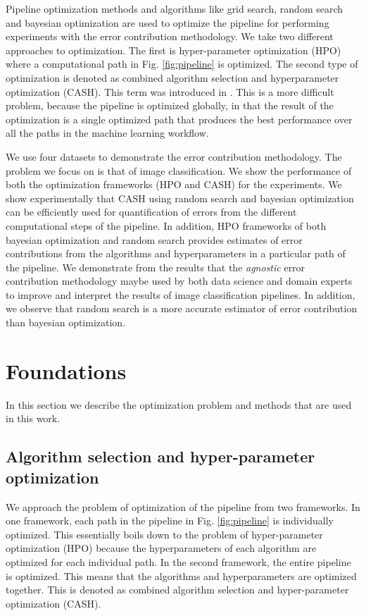 Pipeline optimization methods and algorithms like grid search, random search \cite{bergstra2012random} and bayesian optimization \cite{snoek2012practical} are used to optimize the pipeline for performing experiments with the error contribution methodology. We take two different approaches to optimization. The first is hyper-parameter optimization (HPO) where a computational path in Fig. \ref{fig:pipeline} is optimized. The second type of optimization is denoted as combined algorithm selection and hyperparameter optimization (CASH). This term was introduced in \cite{thornton2013auto}. This is a more difficult problem, because the pipeline is optimized globally, in that the result of the optimization is a single optimized path that produces the best performance over all the paths in the machine learning workflow.  

We use four datasets to demonstrate the error contribution methodology. The problem we focus on is that of image classification. We show the performance of both the optimization frameworks (HPO and CASH) for the experiments. We show experimentally that CASH using random search and bayesian optimization can be efficiently used for quantification of errors from the different computational steps of the pipeline. In addition, HPO frameworks of both bayesian optimization and random search provides  estimates of error contributions from the algorithms and hyperparameters in a particular path of the pipeline.
We demonstrate from the results that the \textit{agnostic} error contribution methodology maybe used by both data science and domain experts to improve and interpret the results of image classification pipelines. In addition, we observe that random search is a more accurate estimator of error contribution than bayesian optimization.

\section{Foundations}
\label{sec2}
In this section we describe the optimization problem and methods that are used in this work. 
\subsection{Algorithm selection and hyper-parameter optimization}
\label{subsec_AS_HPO}
We approach the problem of optimization of the pipeline from two frameworks. In one framework, each path in the pipeline in Fig. \ref{fig:pipeline} is individually optimized. This essentially boils down to the problem of hyper-parameter optimization (HPO)  because the hyperparameters of each algorithm are optimized for each individual path. In the second framework, the entire pipeline is optimized. This means that the algorithms and hyperparameters are optimized together. This is denoted as combined algorithm selection and hyper-parameter optimization (CASH).

